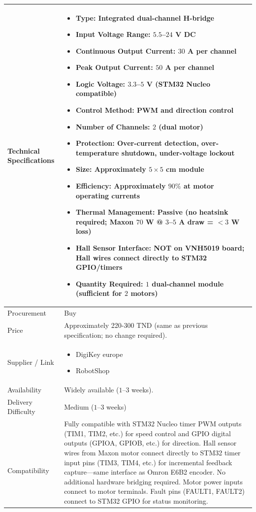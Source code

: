 \documentclass[12pt,a4paper]{article}
\begin{document}
\begin{longtable}{|p{4cm}|p{10cm}|}
Technical Specifications &
\begin{itemize}
\item Type: Integrated dual-channel H-bridge
\item Input Voltage Range: $5.5$--$24$ V DC
\item Continuous Output Current: $30$ A per channel
\item Peak Output Current: $50$ A per channel
\item Logic Voltage: $3.3$--$5$ V (STM32 Nucleo compatible)
\item Control Method: PWM and direction control
\item Number of Channels: $2$ (dual motor)
\item Protection: Over-current detection, over-temperature shutdown, under-voltage lockout
\item Size: Approximately $5 \times 5$ cm module
\item Efficiency: Approximately $90\%$ at motor operating currents
\item Thermal Management: Passive (no heatsink required; Maxon $70$ W @ $3$--$5$ A draw = $<3$ W loss)
\item Hall Sensor Interface: NOT on VNH5019 board; Hall wires connect directly to STM32 GPIO/timers
\item Quantity Required: $1$ dual-channel module (sufficient for $2$ motors)
\end{itemize}
\\
\hline

Procurement &
Buy \\
\hline

Price &
Approximately 220-300 TND (same as previous specification; no change required). \\
\hline

Supplier / Link &
\begin{itemize}
\item DigiKey europe
\item RobotShop
\end{itemize}
\\
\hline

Availability &
 Widely available ($1$--$3$ weeks). \\
\hline
Delivery Difficulty &
 Medium ($1$--$3$ weeks) \\
\

Compatibility &
Fully compatible with STM32 Nucleo timer PWM outputs (TIM1, TIM2, etc.) for speed control and GPIO digital outputs (GPIOA, GPIOB, etc.) for direction. Hall sensor wires from Maxon motor connect directly to STM32 timer input pins (TIM3, TIM4, etc.) for incremental feedback capture---same interface as Omron E6B2 encoder. No additional hardware bridging required. Motor power inputs connect to motor terminals. Fault pins (FAULT1, FAULT2) connect to STM32 GPIO for status monitoring. \\
\hline


\end{longtable}
\end{document}

